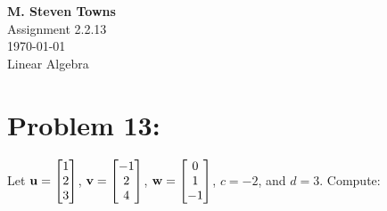 \documentclass{report}
\begin{document}
\begin{center}
	\textbf{M. Steven Towns}\\
	Assignment 2.2.13\\
	\today\\
	Linear Algebra\\
\end{center}

\hrulefill
\section*{Problem 13:}
Let $\bold{u} = \begin{bmatrix} 1\\ 2 \\ 3\end{bmatrix}$, 
	$\bold{v} = \begin{bmatrix}-1\\ 2 \\ 4\end{bmatrix}$, 
	$\bold{w} = \begin{bmatrix} 0\\ 1 \\-1\end{bmatrix}$,
	$c = -2$, and $d =3$.
\bigskip
\bigskip
\newline
Compute:
\end{document}
